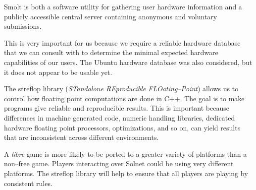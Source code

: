 
Smolt is both a software utility for gathering user hardware information and a publicly accessible central server containing anonymous and voluntary submissions.

This is very important for us because we require a reliable hardware database that we can consult with to determine the minimal expected hardware capabilities of our users. The Ubuntu hardware database was also considered, but it does not appear to be usable yet.


The streflop library ({\it STandalone REproducible FLOating--Point}) allows us to control how floating point computations are done in C++. The goal is to make programs give reliable and reproducible results. This is important because differences in machine generated code, numeric handling libraries, dedicated hardware floating point processors, optimizations, and so on, can yield results that are inconsistent across different environments. 

A {\it libre} game is more likely to be ported to a greater variety of platforms than a non--free game. Players interacting over Solnet could be using very different platforms. The streflop library will help to ensure that all players are playing by consistent rules.


\stopitemize

